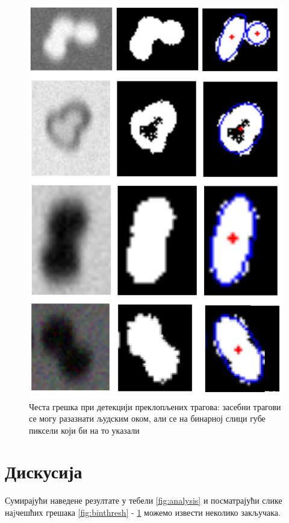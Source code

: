 \documentclass[11pt,a4paper,serbian,oneside]{book}
\begin{document}
\begin{figure}[H]
\begin{center}
\includegraphics[width=150mm]{images/error01.png}
\end{center}
\caption{Честа грешка при детекцији преклопљених трагова: засебни трагови се могу разазнати људским оком, али се на бинарној слици губе пиксели који би на то указали}
\label{fig:error_overlapped}
\end{figure}

\section{Дискусија}

Сумирајући наведене резултате у тебели \ref{fig:analysis} и посматрајући слике наjчешћих грешака  \ref{fig:binthresh} - \ref{fig:error_overlapped} можемо извести неколико закључака.
\end{document}

